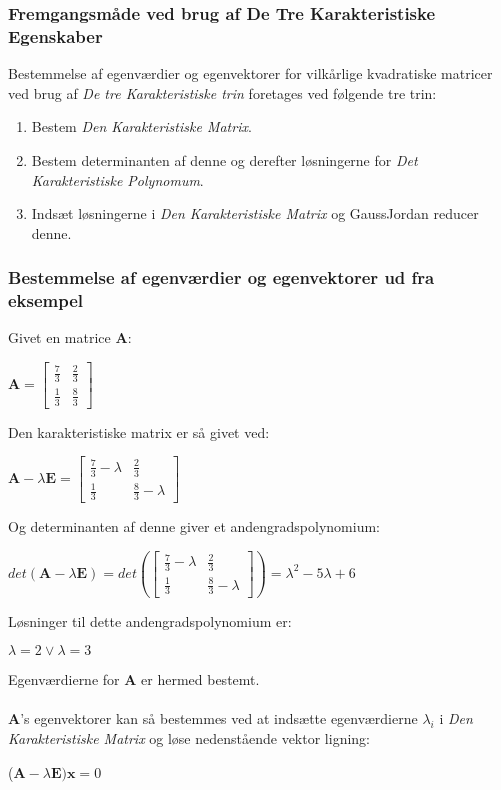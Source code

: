 \documentclass{article}
\newcommand{\cent}[1]{\begin{center}#1\end{center}}
\newcommand{\smallMatrix}[4]{\ensuremath{\begin{bmatrix}
			#1 & #2 \\
			#3 & #4
\end{bmatrix}}}
\begin{document}
  	\subsubsection{Fremgangsmåde ved brug af De Tre Karakteristiske Egenskaber}
  	
  	Bestemmelse af egenværdier og egenvektorer for vilkårlige kvadratiske matricer ved brug af \textit{De tre Karakteristiske trin} foretages ved følgende tre trin:
  	\begin{enumerate}
  		\item  Bestem \textit{Den Karakteristiske Matrix}.
  		\item Bestem determinanten af denne og derefter løsningerne for \textit{Det Karakteristiske Polynomum}.
  		\item Indsæt løsningerne i \textit{Den Karakteristiske Matrix} og GaussJordan reducer denne.
  	\end{enumerate}
  	
	\subsubsection{Bestemmelse af egenværdier og egenvektorer ud fra eksempel}
	
	Givet en matrice \textbf{A}:
	
	\cent{$ \textbf{A} = \smallMatrix{\frac{7}{3}}{\frac{2}{3}}{\frac{1}{3}}{\frac{8}{3}} $}
	
	Den karakteristiske matrix er så givet ved:
	
	\cent{$ \textbf{A}- \lambda \textbf{E} = \smallMatrix{\frac{7}{3}- \lambda}{\frac{2}{3}}{\frac{1}{3}}{\frac{8}{3}- \lambda} $}
	
	Og determinanten af denne giver et andengradspolynomium:
	
	\cent{$ det(\textbf{A}- \lambda \textbf{E}) = det(\smallMatrix{\frac{7}{3}- \lambda}{\frac{2}{3}}{\frac{1}{3}}{\frac{8}{3}- \lambda})= \lambda^2-5\lambda+6$}
	
	Løsninger til dette andengradspolynomium er:
	
	\cent{$ \lambda = 2 \vee \lambda = 3 $}
	
	Egenværdierne for \textbf{A} er hermed bestemt.\\\\
	\textbf{A}'s egenvektorer kan så bestemmes ved at indsætte egenværdierne $\lambda_i$ i \textit{Den Karakteristiske Matrix} og løse nedenstående vektor ligning:
	
	\cent{($ \textbf{A}-\lambda \textbf{E})\textbf{x}=0$}
	
\end{document}
